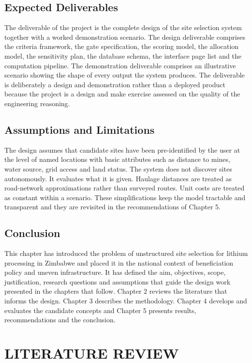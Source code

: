 \documentclass[12pt,a4paper]{report}
\begin{document}
\section{Expected Deliverables}
The deliverable of the project is the complete design of the site
selection system together with a worked demonstration scenario. The
design deliverable comprises the criteria framework, the gate
specification, the scoring model, the allocation model, the
sensitivity plan, the database schema, the interface page list and
the computation pipeline. The demonstration deliverable comprises an
illustrative scenario showing the shape of every output the system
produces. The deliverable is deliberately a design and demonstration
rather than a deployed product because the project is a design and
make exercise assessed on the quality of the engineering reasoning.

\section{Assumptions and Limitations}
The design assumes that candidate sites have been pre-identified by the
user at the level of named locations with basic attributes such as
distance to mines, water source, grid access and land status. The
system does not discover sites autonomously. It evaluates what it is
given. Haulage distances are treated as road-network approximations
rather than surveyed routes. Unit costs are treated as constant within
a scenario. These simplifications keep the model tractable and
transparent and they are revisited in the recommendations of Chapter 5.

\section{Conclusion}
This chapter has introduced the problem of unstructured site selection
for lithium processing in Zimbabwe and placed it in the national
context of beneficiation policy and uneven infrastructure. It has
defined the aim, objectives, scope, justification, research questions
and assumptions that guide the design work presented in the chapters
that follow. Chapter 2 reviews the literature that informs the design.
Chapter 3 describes the methodology. Chapter 4 develops and evaluates
the candidate concepts and Chapter 5 presents results,
recommendations and the conclusion.

\chapter{LITERATURE REVIEW}
\end{document}
